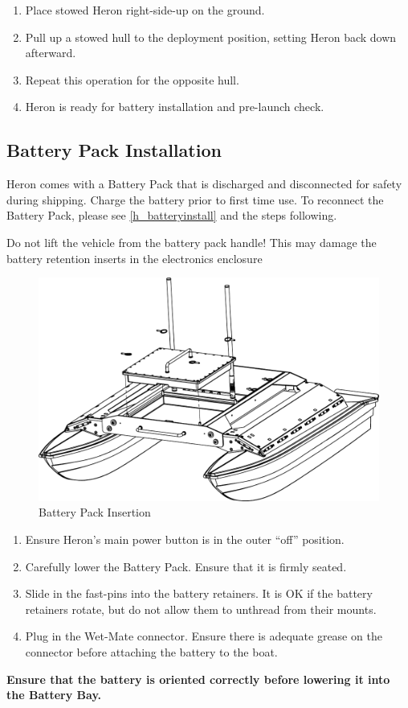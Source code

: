 \documentclass[]{clearpath-latex/clearpath-manual}
\begin{document}
\begin{enumerate}[nolistsep]
	\item Place stowed Heron right-side-up on the ground.
	\item Pull up a stowed hull to the deployment position, setting Heron back down afterward.
	\item Repeat this operation for the opposite hull.
	\item Heron is ready for battery installation and pre-launch check.
\end{enumerate}
\newpage

\subsection{Battery Pack Installation}
Heron comes with a Battery Pack that is discharged and disconnected for safety during shipping. Charge the battery prior to first time use.
To reconnect the Battery Pack, please see \autoref{h_batteryinstall} and the steps following.

\begin{warning}
Do not lift the vehicle from the battery pack handle! This may damage the battery retention inserts in the electronics enclosure
\end{warning}

\begin{figure}[h]
  \centering
  \includegraphics[width=0.75\linewidth]{graphics/h-battery.pdf}
  \caption{Battery Pack Insertion}
  \label{h_batteryinstall}
\end{figure}

\begin{enumerate}[nolistsep]
	\item Ensure Heron's main power button is in the outer “off” position.
	\item Carefully lower the Battery Pack. Ensure that it is firmly seated.
	\item Slide in the fast-pins into the battery retainers. It is OK if the battery retainers rotate, but do not allow them to unthread from their mounts.
	\item Plug in the Wet-Mate connector. Ensure there is adequate grease on the connector before attaching the battery to the boat.
\end{enumerate}
\textbf{Ensure that the battery is oriented correctly before lowering it into the Battery Bay.}
\end{document}
